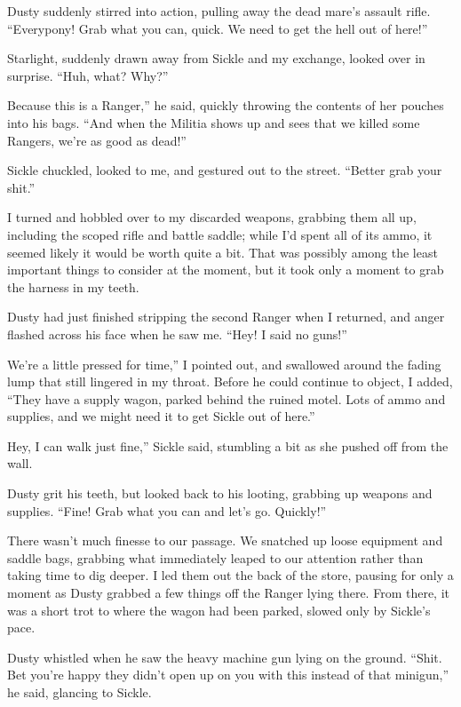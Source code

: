 Dusty suddenly stirred into action, pulling away the dead mare’s assault rifle. “Everypony! Grab what you can, quick. We need to get the hell out of here!”

Starlight, suddenly drawn away from Sickle and my exchange, looked over in surprise. “Huh, what? Why?”

\leavevmode{}Because this is a Ranger,” he said, quickly throwing the contents of her pouches into his bags. “And when the Militia shows up and sees that we killed some Rangers, we’re as good as dead!”

Sickle chuckled, looked to me, and gestured out to the street. “Better grab your shit.”

I turned and hobbled over to my discarded weapons, grabbing them all up, including the scoped rifle and battle saddle; while I’d spent all of its ammo, it seemed likely it would be worth quite a bit. That was possibly among the least important things to consider at the moment, but it took only a moment to grab the harness in my teeth.

Dusty had just finished stripping the second Ranger when I returned, and anger flashed across his face when he saw me. “Hey! I said no guns!”

\leavevmode{}We’re a little pressed for time,” I pointed out, and swallowed around the fading lump that still lingered in my throat. Before he could continue to object, I added, “They have a supply wagon, parked behind the ruined motel. Lots of ammo and supplies, and we might need it to get Sickle out of here.”

\leavevmode{}Hey, I can walk just fine,” Sickle said, stumbling a bit as she pushed off from the wall.

Dusty grit his teeth, but looked back to his looting, grabbing up weapons and supplies. “Fine! Grab what you can and let’s go. Quickly!”

There wasn’t much finesse to our passage. We snatched up loose equipment and saddle bags, grabbing what immediately leaped to our attention rather than taking time to dig deeper. I led them out the back of the store, pausing for only a moment as Dusty grabbed a few things off the Ranger lying there. From there, it was a short trot to where the wagon had been parked, slowed only by Sickle’s pace.

Dusty whistled when he saw the heavy machine gun lying on the ground. “Shit. Bet you’re happy they didn’t open up on you with this instead of that minigun,” he said, glancing to Sickle.

